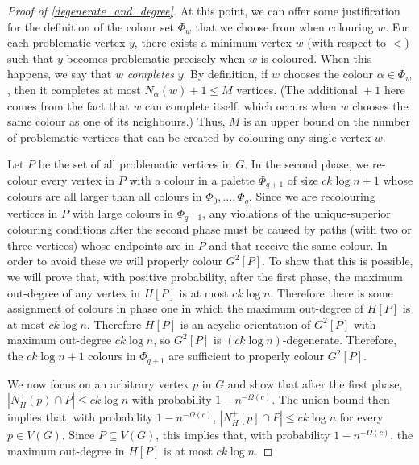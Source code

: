\documentclass{patmorin}
\newcommand{\defin}[1]{\emph{\color{brightmaroon}#1}}
\begin{document}
\begin{proof}[Proof of \cref{degenerate_and_degree}]
  At this point, we can offer some justification for the definition of the colour set $\Phi_w$ that we choose from when colouring $w$. For each problematic vertex $y$, there exists a minimum vertex $w$ (with respect to $<$) such that $y$ becomes problematic precisely when $w$ is coloured.  When this happens, we say that $w$ \defin{completes} $y$. By definition, if $w$ chooses the colour $\alpha\in\Phi_w$, then it completes at most $N_{\alpha}(w)+1\le M$ vertices.  (The additional ${}+1$ here comes from the fact that $w$ can complete itself, which occurs when $w$ chooses the same colour as one of its neighbours.) Thus, $M$ is an upper bound on the number of problematic vertices that can be created by colouring any single vertex $w$.

  Let $P$ be the set of all problematic vertices in $G$.  In the second phase, we re-colour every vertex in $P$ with a colour in a palette $\Phi_{q+1}$ of size $ck\log n + 1$ whose colours are all larger than all colours in $\Phi_0,\ldots,\Phi_q$.  Since we are recolouring vertices in $P$ with large colours in $\Phi_{q+1}$, any violations of the unique-superior colouring conditions after the second phase must be caused by paths (with two or three vertices) whose endpoints are in $P$ and that receive the same colour.  In order to avoid these we will properly colour $G^2[P]$.  To show that this is possible, we will prove that, with positive probability, after the first phase, the maximum out-degree of any vertex in $H[P]$ is at most $ck\log n$.  Therefore there is some assignment of colours in phase one in which the maximum out-degree of $H[P]$ is at most $ck\log n$.  Therefore $H[P]$ is an acyclic orientation of $G^2[P]$ with maximum out-degree $ck\log n$, so $G^2[P]$ is $(ck\log n)$-degenerate.  Therefore, the $ck\log n + 1$ colours in $\Phi_{q+1}$ are sufficient to properly colour $G^2[P]$.

  We now focus on an arbitrary vertex $p$ in $G$ and show that after the first phase, $|N^+_{H}(p)\cap P|\le ck\log n$ with probability $1-n^{-\Omega(c)}$.  The union bound then implies that, with probability $1-n^{-\Omega(c)}$, $|N^+_{H}[p]\cap P|\le ck\log n$ for every $p\in V(G)$.  Since $P\subseteq V(G)$, this implies that, with probability $1-n^{-\Omega(c)}$, the maximum out-degree in $H[P]$ is at most $ck\log n$.


\end{proof}
\end{document}
